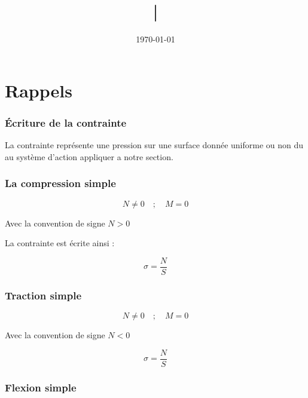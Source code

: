 \documentclass[12pt,a4paper]{article}
\title{|}
\author{}
\date{\today}
\begin{document}
	
	
	\tableofcontents
	
	\newpage
	
	
	
	\part{Rappels}
	
	
	
	\section{Écriture de la contrainte}
	
	La contrainte représente une pression sur une surface donnée uniforme ou non du au système d'action appliquer a notre section.
	
	
	\section{La compression simple}
	
	\[ N \neq 0 \quad;\quad M = 0 \]
	
	Avec la convention de signe $N > 0$
	
	\vspace{\baselineskip}
	
	La contrainte est écrite ainsi :
	
	\[ \sigma = \dfrac{N}{S} \]
	
	\section{Traction simple}
	
	\[ N \neq 0 \quad;\quad M = 0 \]
	
	Avec la convention de signe $N < 0$
	
	\[ \sigma = \dfrac{N}{S} \]
	
	
	
	\section{Flexion simple}
	
\end{document}
